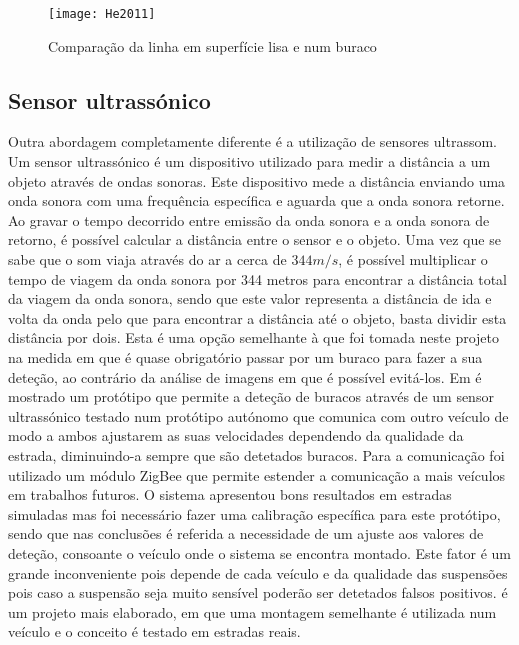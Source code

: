 \begin{figure}[htbp]
	\centering
	\texttt{[image: He2011]}
	\caption[Comparação da linha em superfície lisa e num buraco]{Comparação da linha em superfície lisa e num buraco \footnotemark}
	\label{fig:sensor_kinect}
\end{figure}
\vspace{5cm}

\subsection{Sensor ultrassónico}
\label{subsec:sensor_ultrassonico}
Outra abordagem completamente diferente é a utilização de sensores ultrassom.
Um sensor ultrassónico é um dispositivo utilizado para medir a distância a um objeto através de ondas sonoras.
Este dispositivo mede a distância enviando uma onda sonora com uma frequência específica e aguarda que a onda sonora retorne.
Ao gravar o tempo decorrido entre emissão da onda sonora e a onda sonora de retorno, é possível calcular a distância entre o sensor e o objeto.
Uma vez que se sabe que o som viaja através do ar a cerca de $344 m/s$, é possível multiplicar o tempo de viagem da onda sonora por 344 metros para encontrar a distância total da viagem da onda sonora, sendo que este valor representa a distância de ida e volta da onda pelo que para encontrar a distância até o objeto, basta dividir esta distância por dois.
Esta é uma opção semelhante à que foi tomada neste projeto na medida em que é quase obrigatório passar por um buraco para fazer a sua deteção, ao contrário da análise de imagens em que é possível evitá-los. 
Em \cite{Hegde2015} é mostrado um protótipo que permite a deteção de buracos através de um sensor ultrassónico testado num protótipo autónomo que comunica com outro veículo de modo a ambos ajustarem as suas velocidades dependendo da qualidade da estrada, diminuindo-a sempre que são detetados buracos.
Para a comunicação foi utilizado um módulo ZigBee que permite estender a comunicação a mais veículos em trabalhos futuros.
O sistema apresentou bons resultados em estradas simuladas mas foi necessário fazer uma calibração específica para este protótipo, sendo que nas conclusões é referida a necessidade de um ajuste aos valores de deteção, consoante o veículo onde o sistema se encontra montado.
Este fator é um grande inconveniente pois depende de cada veículo e da qualidade das suspensões pois caso a suspensão seja muito sensível poderão ser detetados falsos positivos.
\cite{Madli2015} é um projeto mais elaborado, em que uma montagem semelhante é utilizada num veículo e o conceito é testado em estradas reais.
